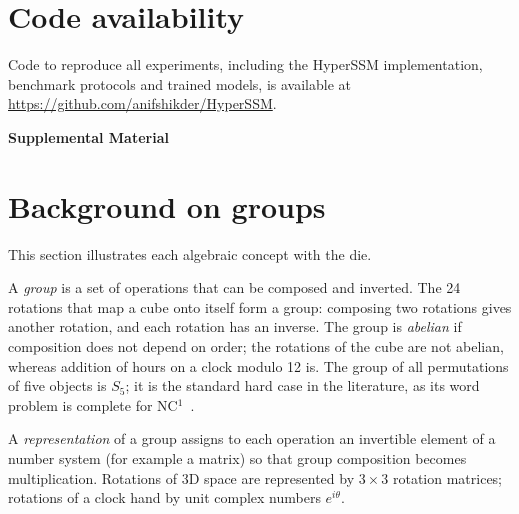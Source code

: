 \documentclass[aps,prx,reprint,superscriptaddress,longbibliography,nofootinbib,floatfix]{revtex4-2}
\theoremstyle{plain}
\theoremstyle{definition}
\begin{document}
\section*{Code availability}
Code to reproduce all experiments, including the HyperSSM implementation,
benchmark protocols and trained models, is available at
\url{https://github.com/anifshikder/HyperSSM}.





\clearpage
\onecolumngrid
\begin{center}
\textbf{\large Supplemental Material}
\end{center}
\setcounter{equation}{0}
\setcounter{figure}{0}
\setcounter{table}{0}
\setcounter{section}{0}
\setcounter{secnumdepth}{3}
\renewcommand{\theequation}{S\arabic{equation}}
\renewcommand{\thefigure}{S\arabic{figure}}
\renewcommand{\thetable}{S\arabic{table}}
\renewcommand{\thesection}{S\arabic{section}}
\renewcommand{\thelemma}{S\arabic{lemma}}
\renewcommand{\thesubsection}{\thesection.\arabic{subsection}}

\section{Background on groups}\label{sm:background}

This section illustrates each algebraic concept with the die.

A \emph{group} is a set of operations that can be composed and inverted.
The 24 rotations that map a cube onto itself form a group: composing two
rotations gives another rotation, and each rotation has an inverse. The
group is \emph{abelian} if composition does not depend on order; the
rotations of the cube are not abelian, whereas addition of hours on a clock
modulo 12 is. The group of all permutations of five objects is $S_5$; it is
the standard hard case in the literature, as its word problem is complete
for NC$^1$~\cite{barrington,merrill_illusion}.

A \emph{representation} of a group assigns to each operation an invertible
element of a number system (for example a matrix) so that group composition
becomes multiplication. Rotations of 3D space are represented by $3\times3$
rotation matrices; rotations of a clock hand by unit complex numbers
$e^{i\theta}$.
\end{document}
